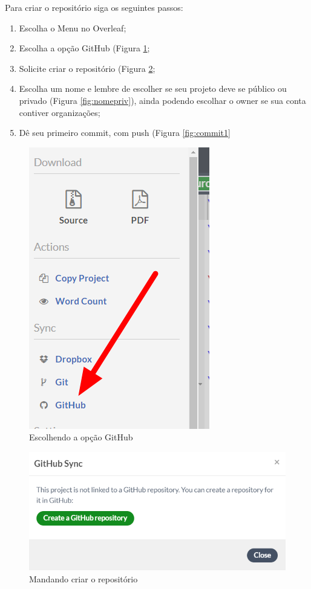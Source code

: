 \documentclass{article}
\begin{document}
Para criar o repositório siga os seguintes passos:
\begin{enumerate}
    \item Escolha o Menu no Overleaf;
    \item Escolha a opção GitHub (Figura \ref{fig:git1};
    \item Solicite criar o repositório (Figura \ref{fig:create};
    \item Escolha um nome e lembre de escolher se seu projeto deve se público ou privado (Figura \ref{fig:nomepriv}), ainda podendo escolhar o owner se sua conta contiver organizações;
    \item Dê seu primeiro commit, com push (Figura \ref{fig:commit1}
\end{enumerate}

\begin{figure}[hbt]
    \centering
    \includegraphics[width=0.5\linewidth]{Image001.png}
    \caption{Escolhendo a opção GitHub}
    \label{fig:git1}
\end{figure}

\begin{figure}[hbt]
    \centering
    \includegraphics[width=0.9\linewidth]{Image002.png}
    \caption{Mandando criar o repositório}
    \label{fig:create}
\end{figure}
\end{document}
